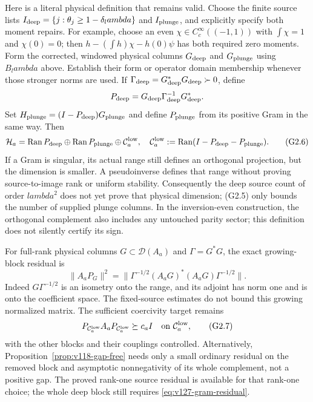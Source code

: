 \documentclass[11pt]{article}
\def\lambda{lambda}%
\theoremstyle{remark}
\begin{document}
Here is a literal physical definition that remains valid. Choose the
finite source lists $I_{\rm deep}=\{j:\theta_j\ge1-\delta_\lambda\}$
and $I_{\rm plunge}$, and explicitly specify both moment repairs.
For example, choose an even $\chi\in C_c^\infty((-1,1))$ with
$\int\chi=1$ and $\chi(0)=0$; then
$h-(\int h)\chi-h(0)\psi$ has both required zero moments.
Form the corrected, windowed physical columns $G_{\rm deep}$ and
$G_{\rm plunge}$ using $B_\lambda$ above. Establish their form or
operator domain membership whenever those stronger norms are used.
If $\Gamma_{\rm deep}=G_{\rm deep}^*G_{\rm deep}\succ0$, define
\[
 P_{\rm deep}=G_{\rm deep}\Gamma_{\rm deep}^{-1}G_{\rm deep}^*.
\]
Set $H_{\rm plunge}=(I-P_{\rm deep})G_{\rm plunge}$ and define
$P_{\rm plunge}$ from its positive Gram in the same way. Then
\[
 \mathcal H_a=\operatorname{Ran}P_{\rm deep}\oplus
 \operatorname{Ran}P_{\rm plunge}\oplus\mathcal C_a^{\rm low},
 \quad
 \mathcal C_a^{\rm low}:=\operatorname{Ran}(I-P_{\rm deep}-P_{\rm plunge}).
 \tag{G2.6}
\]
If a Gram is singular, its actual range still defines an orthogonal
projection, but the dimension is smaller. A pseudoinverse defines that
range without proving source-to-image rank or uniform stability.
Consequently the deep source count of order $\lambda^2$ does not yet
prove that physical dimension; (G2.5) only bounds the number of supplied
plunge columns. In the inversion-even construction, the orthogonal
complement also includes any untouched parity sector; this definition
does not silently certify its sign.

For full-rank physical columns $G\subset\mathcal D(A_a)$ and
$\Gamma=G^*G$, the exact growing-block residual is
\begin{equation}\label{eq:v127-gram-residual}
 \|A_aP_G\|^2
 =\|\Gamma^{-1/2}(A_aG)^*(A_aG)\Gamma^{-1/2}\|.
\end{equation}
Indeed $G\Gamma^{-1/2}$ is an isometry onto the range, and its
adjoint has norm one and is onto the coefficient space. The
fixed-source estimates do not bound this growing normalized matrix.
The sufficient coercivity target remains
\[
 P_{\mathcal C_a^{\rm low}}A_aP_{\mathcal C_a^{\rm low}}\succeq c_a I
 \quad\hbox{on }\mathcal C_a^{\rm low},
 \tag{G2.7}
\]
with the other blocks and their couplings controlled. Alternatively,
Proposition~\ref{prop:v118-gap-free} needs only a small ordinary
residual on the removed block and asymptotic nonnegativity of its
whole complement, not a positive gap. The proved rank-one source
residual is available for that rank-one choice; the whole deep block
still requires \eqref{eq:v127-gram-residual}.
\end{document}
